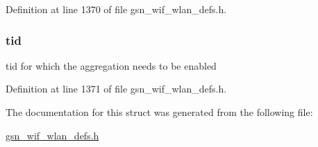 Definition at line 1370 of file gsn\_\-wif\_\-wlan\_\-defs.h.

\hypertarget{a00366_abf69ed815c8482f9995e41bc0aff9043}{
\subsubsection[{tid}]{ {\bf tid}}}
\label{a00366_abf69ed815c8482f9995e41bc0aff9043}
tid for which the aggregation needs to be enabled 

Definition at line 1371 of file gsn\_\-wif\_\-wlan\_\-defs.h.



The documentation for this struct was generated from the following file:\begin{DoxyCompactItemize}
\item 
\hyperlink{a00613}{gsn\_\-wif\_\-wlan\_\-defs.h}\end{DoxyCompactItemize}
